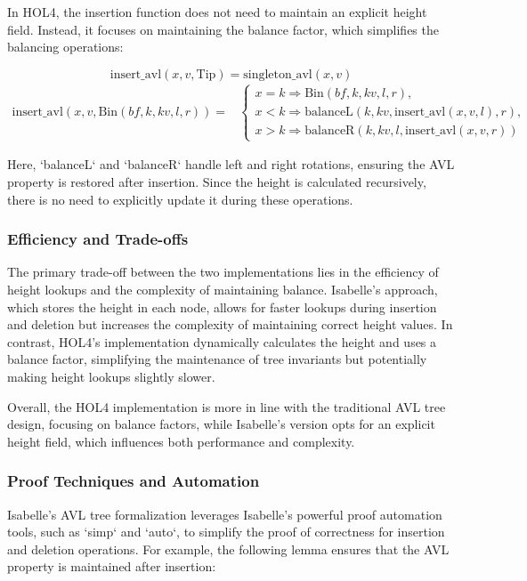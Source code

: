 In HOL4, the insertion function does not need to maintain an explicit height field. Instead, it focuses on maintaining the balance factor, which simplifies the balancing operations:

\[
\text{insert\_avl}(x, v, \text{Tip}) = \text{singleton\_avl}(x, v)
\]
\begin{align*}
	\text{insert\_avl}(x, v, \text{Bin}(bf, k, kv, l, r)) = 
	& \begin{cases}
		x = k \Rightarrow \text{Bin}(bf, k, kv, l, r), \\
		x < k \Rightarrow \text{balanceL}(k, kv, \text{insert\_avl}(x, v, l), r), \\
		x > k \Rightarrow \text{balanceR}(k, kv, l, \text{insert\_avl}(x, v, r))
	\end{cases}
\end{align*}

Here, `balanceL` and `balanceR` handle left and right rotations, ensuring the AVL property is restored after insertion. Since the height is calculated recursively, there is no need to explicitly update it during these operations.

\subsubsection{Efficiency and Trade-offs}

The primary trade-off between the two implementations lies in the efficiency of height lookups and the complexity of maintaining balance. Isabelle's approach, which stores the height in each node, allows for faster lookups during insertion and deletion but increases the complexity of maintaining correct height values. In contrast, HOL4’s implementation dynamically calculates the height and uses a balance factor, simplifying the maintenance of tree invariants but potentially making height lookups slightly slower.

Overall, the HOL4 implementation is more in line with the traditional AVL tree design, focusing on balance factors, while Isabelle’s version opts for an explicit height field, which influences both performance and complexity.

\subsubsection{Proof Techniques and Automation}
Isabelle’s AVL tree formalization leverages Isabelle’s powerful proof automation tools, such as `simp` and `auto`, to simplify the proof of correctness for insertion and deletion operations. For example, the following lemma ensures that the AVL property is maintained after insertion:

